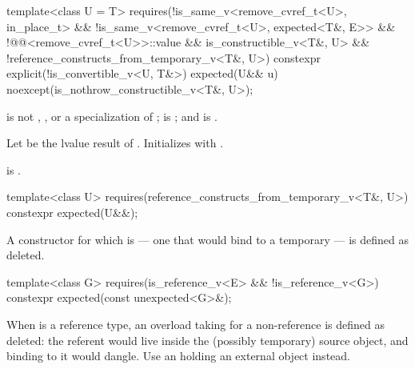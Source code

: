 %
\begin{itemdecl}
template<class U = T>
  requires(!is_same_v<remove_cvref_t<U>, in_place_t> &&
           !is_same_v<remove_cvref_t<U>, expected<T&, E>> &&
           !@@<remove_cvref_t<U>>::value &&
           is_constructible_v<T&, U> && !reference_constructs_from_temporary_v<T&, U>)
constexpr explicit(!is_convertible_v<U, T&>)
    expected(U&& u) noexcept(is_nothrow_constructible_v<T&, U>);
\end{itemdecl}

\begin{itemdescr}
\pnum
\constraints
{} is not , , or a specialization of ;  is ; and  is .

\pnum
\effects
Let  be the lvalue result of . Initializes  with .

\pnum
\ensures
{} is .
\end{itemdescr}

%
\begin{itemdecl}
template<class U>
  requires(reference_constructs_from_temporary_v<T&, U>)
constexpr expected(U&&);
\end{itemdecl}

\begin{itemdescr}
\pnum
\remarks
A constructor for which  is  — one that would bind  to a temporary — is defined as deleted.
\end{itemdescr}

%
\begin{itemdecl}
template<class G>
  requires(is_reference_v<E> && !is_reference_v<G>)
constexpr expected(const unexpected<G>&);
\end{itemdecl}

\begin{itemdescr}
\pnum
\remarks
When  is a reference type, an overload taking  for a non-reference  is defined as deleted: the referent would live inside the (possibly temporary) source  object, and binding  to it would dangle. Use an  holding an external object instead.
\end{itemdescr}

